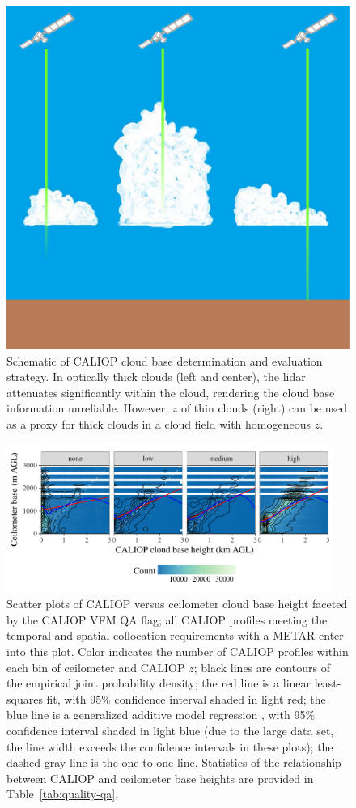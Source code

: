 \documentclass[essd,manuscript]{copernicus}\usepackage[]{graphicx}\usepackage[]{color}
\newenvironment{knitrout}{}{} %
\newcommand\CBH{\ensuremath{z}}
\begin{document}
\begin{figure}
  \centering
  \includegraphics[width=0.5\linewidth,keepaspectratio=true]{figure/CloudFieldCALIOP}
  \caption{Schematic of CALIOP cloud base determination and evaluation strategy.
    In optically thick clouds (left and center), the lidar attenuates
    significantly within the cloud, rendering the cloud base information
    unreliable.  However, \CBH{} of thin clouds (right) can be used as a proxy
    for thick clouds in a cloud field with homogeneous \CBH{}.}
  \label{fig:method}
\end{figure}

\begin{figure}
  \centering
\begin{knitrout}
\color{fgcolor}

{\centering \includegraphics[width=0.95\textwidth]{figure/method-eval-qual-1} 

}



\end{knitrout}
  \caption{Scatter plots of CALIOP versus ceilometer cloud base height faceted
    by the CALIOP VFM QA flag; all CALIOP profiles meeting the temporal and
    spatial collocation requirements with a METAR enter into this plot.  Color
    indicates the number of CALIOP profiles within each bin of ceilometer and
    CALIOP \CBH{}; black lines are contours of the empirical joint probability
    density; the red line is a linear least-squares fit, with 95\% confidence
    interval shaded in light red; the blue line is a generalized additive model
    regression \citep{Wood2011}, with 95\% confidence interval shaded in light
    blue (due to the large data set, the line width exceeds the confidence
    intervals in these plots); the dashed gray line is the one-to-one line.
    Statistics of the relationship between CALIOP and ceilometer base heights
    are provided in Table~\ref{tab:quality-qa}.}
  \label{fig:quality-qa}
\end{figure}
\end{document}
